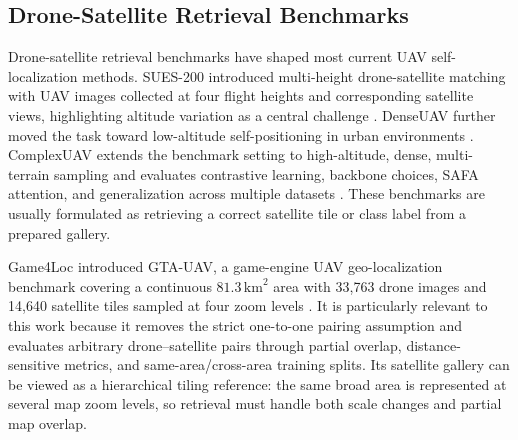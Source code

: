 \documentclass[conference]{IEEEtran}
\begin{document}
\subsection{Drone-Satellite Retrieval Benchmarks}
Drone-satellite retrieval benchmarks have shaped most current UAV
self-localization methods. SUES-200 introduced multi-height drone-satellite
matching with UAV images collected at four flight heights and corresponding
satellite views, highlighting altitude variation as a central challenge
\cite{zhu2023sues}. DenseUAV further moved the task toward low-altitude
self-positioning in urban environments \cite{dai2024denseuav}. ComplexUAV
extends the benchmark setting to high-altitude, dense, multi-terrain sampling
and evaluates contrastive learning, backbone choices, SAFA attention, and
generalization across multiple datasets \cite{chen2025complexuav}. These
benchmarks are usually formulated as retrieving a correct satellite tile or
class label from a prepared gallery.

Game4Loc introduced GTA-UAV, a game-engine UAV geo-localization benchmark
covering a continuous $81.3\,\mathrm{km}^2$ area with 33,763 drone images and
14,640 satellite tiles sampled at four zoom levels \cite{ji2024game4loc}. It
is particularly relevant to this work because it removes the strict
one-to-one pairing assumption and evaluates arbitrary drone--satellite pairs
through partial overlap, distance-sensitive metrics, and same-area/cross-area
training splits. Its satellite gallery can be viewed as a hierarchical tiling
reference: the same broad area is represented at several map zoom levels, so
retrieval must handle both scale changes and partial map overlap.
\end{document}
